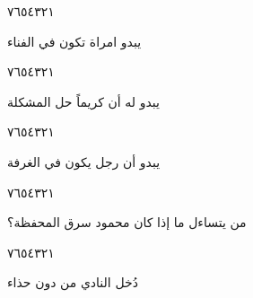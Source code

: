 \documentclass[11pt, a4paper]{article}
\begin{document}
{\begin{center}
        \hfill\textarabic{٧}\hfill\textarabic{٦}\hfill\textarabic{٥}\hfill\textarabic{٤}\hfill\textarabic{٣}\hfill\textarabic{٢}\hfill\textarabic{١}
        \end{center}


\vspace{0.5\baselineskip}\begin{flushright}
\textarabic{يبدو امراة تكون في الفناء}
\end{flushright}

\begin{center}
        \hfill\textarabic{٧}\hfill\textarabic{٦}\hfill\textarabic{٥}\hfill\textarabic{٤}\hfill\textarabic{٣}\hfill\textarabic{٢}\hfill\textarabic{١}
        \end{center}


\vspace{0.5\baselineskip}\begin{flushright}
\textarabic{يبدو له أن كريماً حل المشكلة}
\end{flushright}

\begin{center}
        \hfill\textarabic{٧}\hfill\textarabic{٦}\hfill\textarabic{٥}\hfill\textarabic{٤}\hfill\textarabic{٣}\hfill\textarabic{٢}\hfill\textarabic{١}
        \end{center}


\vspace{0.5\baselineskip}\begin{flushright}
\textarabic{يبدو أن رجل يكون في الغرفة}
\end{flushright}

\begin{center}
        \hfill\textarabic{٧}\hfill\textarabic{٦}\hfill\textarabic{٥}\hfill\textarabic{٤}\hfill\textarabic{٣}\hfill\textarabic{٢}\hfill\textarabic{١}
        \end{center}


\vspace{0.5\baselineskip}\begin{flushright}
\textarabic{من يتساءل ما إذا كان محمود سرق المحفظة؟}
\end{flushright}

\begin{center}
        \hfill\textarabic{٧}\hfill\textarabic{٦}\hfill\textarabic{٥}\hfill\textarabic{٤}\hfill\textarabic{٣}\hfill\textarabic{٢}\hfill\textarabic{١}
        \end{center}


\vspace{0.5\baselineskip}\begin{flushright}
\textarabic{دُخل النادي من دون حذاء}
\end{flushright}

}
\end{document}

